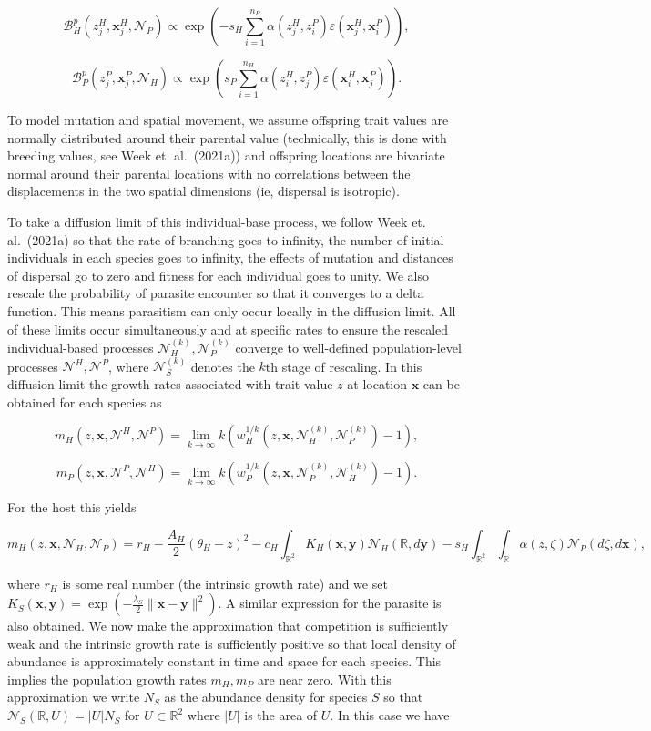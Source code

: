 \documentclass{article}
\begin{document}
\[\mathcal B_H^p(z^H_j,\pmb x^H_j,\mathcal N_P)\propto\exp\left(-s_H\sum_{i=1}^{n_P}\alpha(z^H_j,z^P_i)\varepsilon(\pmb x_j^H,\pmb x_i^P)\right),\]

\[\mathcal B_P^p(z^P_j,\pmb x^P_j,\mathcal N_H)\propto\exp\left(s_P\sum_{i=1}^{n_H}\alpha(z^H_i,z^P_j)\varepsilon(\pmb x_i^H,\pmb x_j^P)\right).\]

To model mutation and spatial movement, we assume offspring trait values
are normally distributed around their parental value (technically, this
is done with breeding values, see Week et. al.~(2021a)) and offspring
locations are bivariate normal around their parental locations with no
correlations between the displacements in the two spatial dimensions
(ie, dispersal is isotropic).

To take a diffusion limit of this individual-base process, we follow
Week et. al.~(2021a) so that the rate of branching goes to infinity, the
number of initial individuals in each species goes to infinity, the
effects of mutation and distances of dispersal go to zero and fitness
for each individual goes to unity. We also rescale the probability of
parasite encounter so that it converges to a delta function. This means
parasitism can only occur locally in the diffusion limit. All of these
limits occur simultaneously and at specific rates to ensure the rescaled
individual-based processes \(\mathcal N_H^{(k)},\mathcal N_P^{(k)}\)
converge to well-defined population-level processes
\(\mathscr N^H,\mathscr N^P\), where \(\mathcal N_S^{(k)}\) denotes the
\(k\)th stage of rescaling. In this diffusion limit the growth rates
associated with trait value \(z\) at location \(\pmb x\) can be obtained
for each species as

\[m_H(z,\pmb x,\mathscr N^H,\mathscr N^P)=\lim_{k\to\infty}k\left(w^{1/k}_H(z,\pmb x,\mathcal N_H^{(k)},\mathcal N_P^{(k)})-1\right),\]

\[m_P(z,\pmb x,\mathscr N^P,\mathscr N^H)=\lim_{k\to\infty}k\left(w^{1/k}_P(z,\pmb x,\mathcal N_P^{(k)},\mathcal N_H^{(k)})-1\right).\]

For the host this yields

\[m_H(z,\pmb x,\mathscr N_H,\mathscr N_P)=r_H-\frac{A_H}{2}(\theta_H-z)^2-c_H\int_{\mathbb R^2}K_H(\pmb x,\pmb y)\mathscr N_H(\mathbb R,d\pmb y)-s_H\int_{\mathbb R^2}\int_{\mathbb R}\alpha(z,\zeta)\mathscr N_P(d\zeta,d\pmb x),\]

where \(r_H\) is some real number (the intrinsic growth rate) and we set
\(K_S(\pmb x,\pmb y)=\exp\left(-\frac{\lambda_S}{2}\|\pmb x-\pmb y\|^2\right)\).
A similar expression for the parasite is also obtained. We now make the
approximation that competition is sufficiently weak and the intrinsic
growth rate is sufficiently positive so that local density of abundance
is approximately constant in time and space for each species. This
implies the population growth rates \(m_H,m_P\) are near zero. With this
approximation we write \(N_S\) as the abundance density for species
\(S\) so that \(\mathscr N_S(\mathbb R,U)=|U|N_S\) for
\(U\subset\mathbb R^2\) where \(|U|\) is the area of \(U\). In this case
we have
\end{document}
